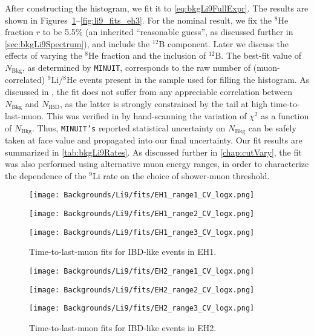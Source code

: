 \documentclass[../thesis.tex]{subfiles}
\begin{document}
After constructing the histogram, we fit it to \autoref{eq:bkgLi9FullExpr}. The results are shown in Figures~\ref{fig:li9_fits_eh1}--\ref{fig:li9_fits_eh3}. For the nominal result, we fix the $^8$He fraction $r$ to be 5.5\% (an inherited ``reasonable guess'', as discussed further in \autoref{sec:bkgLi9Spectrum}), and include the $^{12}$B component. Later we discuss the effects of varying the $^8$He fraction and the inclusion of $^{12}$B. The best-fit value of $N_{\mathrm{Bkg}}$, as determined by \texttt{MINUIT}, corresponds to the raw number of (muon-correlated) $^9$Li/$^8$He events present in the sample used for filling the histogram. As discussed in \cite{ChrisLi9}, the fit does not suffer from any appreciable correlation between $N_{\mathrm{Bkg}}$ and $N_{\mathrm{IBD}}$, as the latter is strongly constrained by the tail at high time-to-last-muon. This was verified in \cite{ChrisLi9} by hand-scanning the variation of $\chi^2$ as a function of $N_{\mathrm{Bkg}}$. Thus, \texttt{MINUIT's} reported statistical uncertainty on $N_{\mathrm{Bkg}}$ can be safely taken at face value and propagated into our final uncertainty. Our fit results are summarized in \autoref{tab:bkgLi9Rates}. As discussed further in \autoref{chap:cutVary}, the fit was also performed using alternative muon energy ranges, in order to characterize the dependence of the $^9$Li rate on the choice of shower-muon threshold.

\begin{figure}[ht]
  \texttt{[image: Backgrounds/Li9/fits/EH1\_range1\_CV\_logx.png]} \\[0.5em]
  \begin{minipage}{0.5\textwidth}%
    \texttt{[image: Backgrounds/Li9/fits/EH1\_range2\_CV\_logx.png]}%
  \end{minipage}%
  \begin{minipage}{0.5\textwidth}%
    \texttt{[image: Backgrounds/Li9/fits/EH1\_range3\_CV\_logx.png]}%
  \end{minipage}%
  \caption{Time-to-last-muon fits for IBD-like events in EH1.}
  \label{fig:li9_fits_eh1}
\end{figure}

\begin{figure}[ht]
  \texttt{[image: Backgrounds/Li9/fits/EH2\_range1\_CV\_logx.png]} \\[0.5em]
  \begin{minipage}{0.5\textwidth}%
    \texttt{[image: Backgrounds/Li9/fits/EH2\_range2\_CV\_logx.png]}%
  \end{minipage}%
  \begin{minipage}{0.5\textwidth}%
    \texttt{[image: Backgrounds/Li9/fits/EH2\_range3\_CV\_logx.png]}%
  \end{minipage}%
  \caption{Time-to-last-muon fits for IBD-like events in EH2.}
  \label{fig:li9_fits_eh2}
\end{figure}
\end{document}
